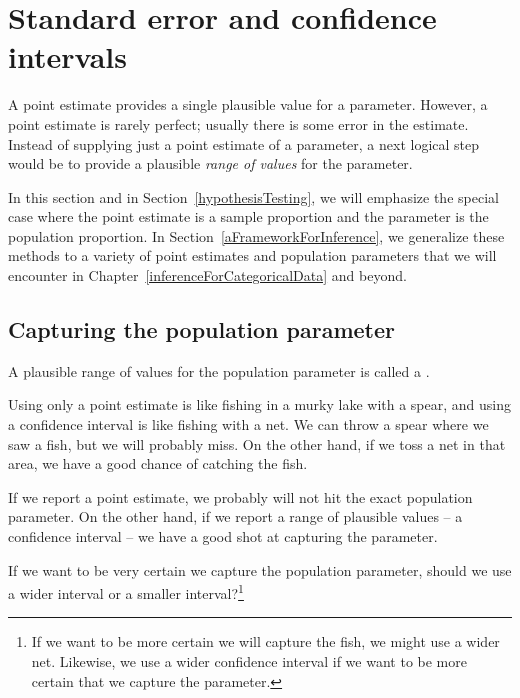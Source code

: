 \section{Standard error and confidence intervals}


A point estimate provides a single plausible value for a parameter. However, a point estimate is rarely perfect; usually there is some error in the estimate. Instead of supplying just a point estimate of a parameter, a next logical step would be to provide a plausible \emph{range of values} for the parameter.

In this section and in Section~\ref{hypothesisTesting}, we will emphasize the special case where the point estimate is a sample proportion and the parameter is the population proportion.  In Section~\ref{aFrameworkForInference}, we generalize these methods to a variety of point estimates and population parameters that we will encounter in Chapter~\ref{inferenceForCategoricalData} and beyond.


\subsection{Capturing the population parameter}

A plausible range of values for the population parameter is called a .

Using only a point estimate is like fishing in a murky lake with a spear, and using a confidence interval is like fishing with a net. We can throw a spear where we saw a fish, but we will probably miss. On the other hand, if we toss a net in that area, we have a good chance of catching the fish.

If we report a point estimate, we probably will not hit the exact population parameter. On the other hand, if we report a range of plausible values -- a confidence interval -- we have a good shot at capturing the parameter.

\begin{exercise}
If we want to be very certain we capture the population parameter, should we use a wider interval or a smaller interval?\footnote{If we want to be more certain we will capture the fish, we might use a wider net. Likewise, we use a wider confidence interval if we want to be more certain that we capture the parameter.}
\end{exercise}


